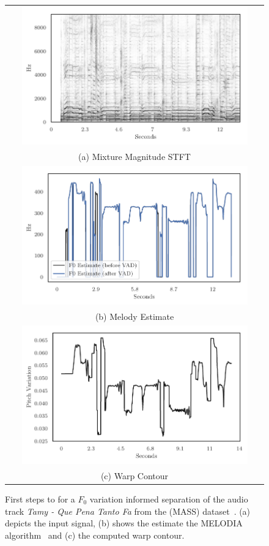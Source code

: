 \begin{figure}
  \centering
\begin{tabular}{c}
  \includegraphics[width=0.9\textwidth]{Chapters/05_Separation_Known/warp-demo/Mixture.pdf} \\
(a) Mixture Magnitude \acs{STFT} \\[6pt]
\includegraphics[width=0.9\textwidth]{Chapters/05_Separation_Known/warp-demo/Melodia.pdf} \\
(b) Melody Estimate \\[6pt]
\includegraphics[width=0.9\textwidth]{Chapters/05_Separation_Known/warp-demo/Contour.pdf} \\
(c) Warp Contour \\[6pt]
\end{tabular}
\caption{First steps to for a $F_0$ variation informed separation of the audio track \emph{Tamy - Que Pena Tanto Fa} from the (MASS) dataset~\cite{MTGMASSdb}. (a) depicts the input signal, (b) shows the estimate the MELODIA algorithm~\cite{salamon12} and (c) the computed warp contour.} %
\label{fig:warp_sisec_demoa}
\end{figure}


